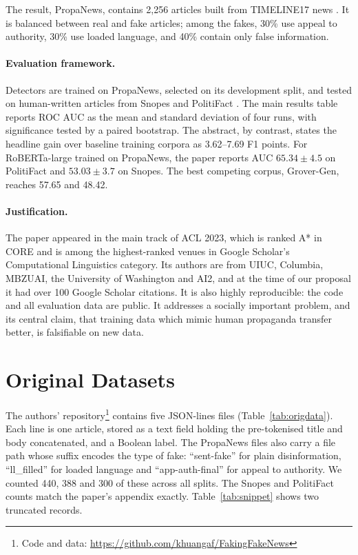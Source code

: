 \documentclass[11pt]{article}
\begin{document}
The result, PropaNews, contains 2,256 articles built from TIMELINE17 news \citep{tran2013timeline}. It is balanced between real and fake articles; among the fakes, 30\% use appeal to authority, 30\% use loaded language, and 40\% contain only false information.

\paragraph{Evaluation framework.} Detectors are trained on PropaNews, selected on its development split, and tested on human-written articles from Snopes \citep{nguyen2020fang} and PolitiFact \citep{shu2018fakenewsnet}. The main results table reports ROC AUC as the mean and standard deviation of four runs, with significance tested by a paired bootstrap. The abstract, by contrast, states the headline gain over baseline training corpora as 3.62--7.69 F1 points. For RoBERTa-large trained on PropaNews, the paper reports AUC $65.34\pm4.5$ on PolitiFact and $53.03\pm3.7$ on Snopes. The best competing corpus, Grover-Gen, reaches 57.65 and 48.42.

\paragraph{Justification.} The paper appeared in the main track of ACL 2023, which is ranked A* in CORE and is among the highest-ranked venues in Google Scholar's Computational Linguistics category. Its authors are from UIUC, Columbia, MBZUAI, the University of Washington and AI2, and at the time of our proposal it had over 100 Google Scholar citations. It is also highly reproducible: the code and all evaluation data are public. It addresses a socially important problem, and its central claim, that training data which mimic human propaganda transfer better, is falsifiable on new data.

\section{Original Datasets}
\label{sec:origdata}

The authors' repository\footnote{Code and data: \url{https://github.com/khuangaf/FakingFakeNews}} contains five JSON-lines files (Table~\ref{tab:origdata}). Each line is one article, stored as a text field holding the pre-tokenised title and body concatenated, and a Boolean label. The PropaNews files also carry a file path whose suffix encodes the type of fake: ``sent-fake'' for plain disinformation, ``ll\_filled'' for loaded language and ``app-auth-final'' for appeal to authority. We counted 440, 388 and 300 of these across all splits. The Snopes and PolitiFact counts match the paper's appendix exactly. Table~\ref{tab:snippet} shows two truncated records.
\end{document}
